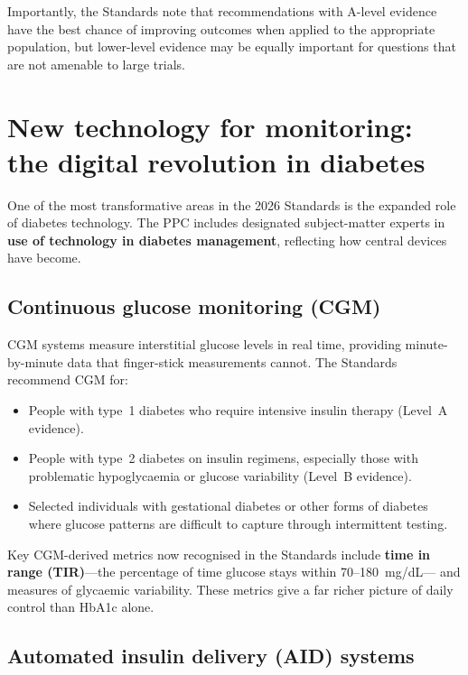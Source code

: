 \documentclass[11pt,a4paper]{article}
\begin{document}
Importantly, the Standards note that recommendations with A-level evidence
have the best chance of improving outcomes when applied to the appropriate
population, but lower-level evidence may be equally important for questions
that are not amenable to large trials.

\section{New technology for monitoring: the digital revolution in diabetes}
\label{sec:tech}

One of the most transformative areas in the 2026 Standards is the expanded
role of diabetes technology. The PPC includes designated subject-matter
experts in \textbf{use of technology in diabetes management}, reflecting how
central devices have become.

\subsection{Continuous glucose monitoring (CGM)}

CGM systems measure interstitial glucose levels in real time, providing
minute-by-minute data that finger-stick measurements cannot. The Standards
recommend CGM for:

\begin{itemize}
  \item People with type~1 diabetes who require intensive insulin therapy
        (Level~A evidence).
  \item People with type~2 diabetes on insulin regimens, especially those
        with problematic hypoglycaemia or glucose variability (Level~B
        evidence).
  \item Selected individuals with gestational diabetes or other forms of
        diabetes where glucose patterns are difficult to capture through
        intermittent testing.
\end{itemize}

Key CGM-derived metrics now recognised in the Standards include \textbf{time
in range (TIR)}---the percentage of time glucose stays within 70--180~mg/dL---
and measures of glycaemic variability. These metrics give a far richer picture
of daily control than HbA1c alone.

\subsection{Automated insulin delivery (AID) systems}
\end{document}
